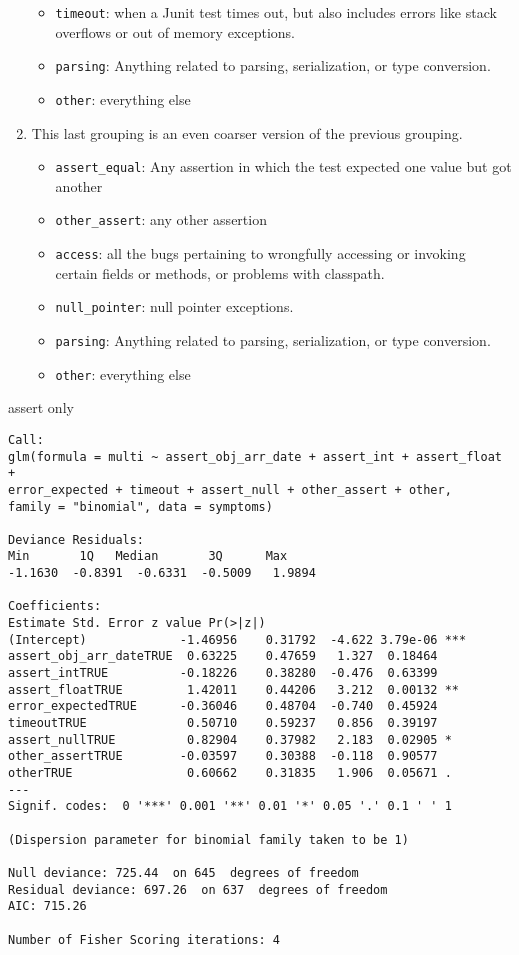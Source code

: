 \begin{enumerate}
\begin{itemize}
		\item \lstinline{timeout}: when a Junit test times out, but also includes errors like stack overflows or out of memory exceptions.
		\item \lstinline{parsing}: Anything related to parsing, serialization, or type conversion.
		\item \lstinline{other}: everything else
	\end{itemize}
	\item This last grouping is an even coarser version of the previous grouping.
	\begin{itemize}
		\item \lstinline{assert_equal}: Any assertion in which the test expected one value but got another
		\item \lstinline{other_assert}: any other assertion
		\item \lstinline{access}: all the bugs pertaining to wrongfully accessing or invoking certain fields or methods, or problems with classpath.
		\item \lstinline{null_pointer}: null pointer exceptions.
		\item \lstinline{parsing}: Anything related to parsing, serialization, or type conversion.
		\item \lstinline{other}: everything else
	\end{itemize}
\end{enumerate}


assert only
\begin{lstlisting}[basicstyle=\tiny]
Call:
glm(formula = multi ~ assert_obj_arr_date + assert_int + assert_float +
error_expected + timeout + assert_null + other_assert + other,
family = "binomial", data = symptoms)

Deviance Residuals:
Min       1Q   Median       3Q      Max
-1.1630  -0.8391  -0.6331  -0.5009   1.9894

Coefficients:
Estimate Std. Error z value Pr(>|z|)
(Intercept)             -1.46956    0.31792  -4.622 3.79e-06 ***
assert_obj_arr_dateTRUE  0.63225    0.47659   1.327  0.18464
assert_intTRUE          -0.18226    0.38280  -0.476  0.63399
assert_floatTRUE         1.42011    0.44206   3.212  0.00132 **
error_expectedTRUE      -0.36046    0.48704  -0.740  0.45924
timeoutTRUE              0.50710    0.59237   0.856  0.39197
assert_nullTRUE          0.82904    0.37982   2.183  0.02905 *
other_assertTRUE        -0.03597    0.30388  -0.118  0.90577
otherTRUE                0.60662    0.31835   1.906  0.05671 .
---
Signif. codes:  0 '***' 0.001 '**' 0.01 '*' 0.05 '.' 0.1 ' ' 1

(Dispersion parameter for binomial family taken to be 1)

Null deviance: 725.44  on 645  degrees of freedom
Residual deviance: 697.26  on 637  degrees of freedom
AIC: 715.26

Number of Fisher Scoring iterations: 4
\end{lstlisting}

